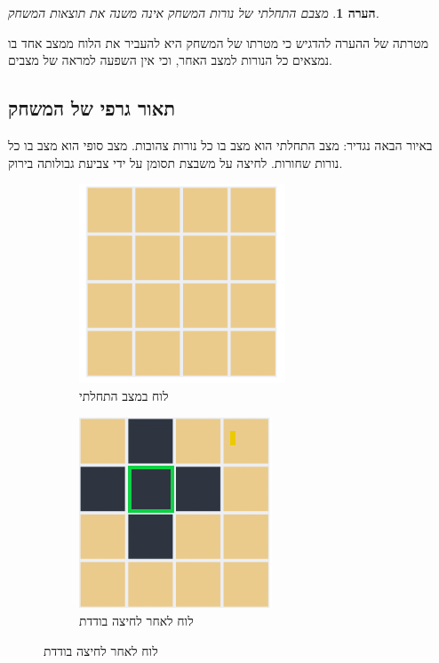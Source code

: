 \documentclass[12pt,leqno]{article}
\theoremstyle{theoremdd}
\newtheorem{comm}{הערה}
\begin{document}
\begin{comm}
מצבם התחלתי של נורות המשחק אינה משנה את תוצאות המשחק.
\end{comm}
מטרתה של ההערה להדגיש כי
מטרתו של המשחק היא להעביר
 את הלוח ממצב אחד בו נמצאים כל הנורות למצב האחר,
 וכי אין השפעה למראה של מצבים.
 
\subsection{תאור גרפי של המשחק}
באיור הבאה נגדיר:
מצב התחלתי הוא מצב בו כל נורות
צהובות.
מצב סופי הוא מצב בו כל נורות שחורות.
לחיצה על משבצת תסומן על ידי צביעת גבולותה בירוק.

\begin{figure}[ht]
    \caption{הסבר שינוי מצב הלוח לאחר לחיצה}
    \centering
    \label{fig: explain game}
    \begin{subfigure}{.3\textwidth}
        \caption{לוח במצב התחלתי}
        \label{subfig: explain game, start}
        \centering
        \includegraphics[scale=0.67]{images/4x4_start_board.PNG}
    \end{subfigure}%
    \begin{subfigure}{.3\textwidth}
        \caption{לוח לאחר לחיצה בודדת}
        \label{subfig: explain game, move}
        \centering
        \includegraphics[scale=0.67]{images/4x4_press.PNG}

\end{subfigure}
\end{figure}
\end{document}
